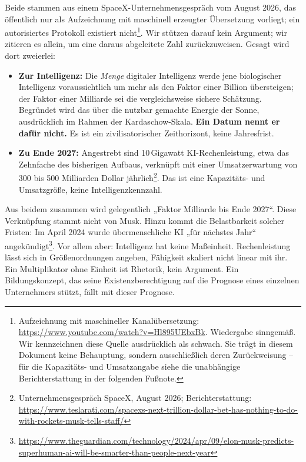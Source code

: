 \documentclass[11pt,a4paper]{article}
\begin{document}
Beide stammen aus einem SpaceX-Unternehmensgespräch vom August 2026, das öffentlich nur als Aufzeichnung mit maschinell erzeugter Übersetzung vorliegt; ein autorisiertes Protokoll existiert nicht\footnote{Aufzeichnung mit maschineller Kanalübersetzung: \url{https://www.youtube.com/watch?v=Hl895UEbxBk}. Wiedergabe sinngemäß. Wir kennzeichnen diese Quelle ausdrücklich als schwach. Sie trägt in diesem Dokument keine Behauptung, sondern ausschließlich deren Zurückweisung -- für die Kapazitäts- und Umsatzangabe siehe die unabhängige Berichterstattung in der folgenden Fußnote.}. Wir stützen darauf kein Argument; wir zitieren es allein, um eine daraus abgeleitete Zahl zurückzuweisen. Gesagt wird dort zweierlei:
\begin{itemize}[label=--]
    \item \textbf{Zur Intelligenz:} Die \textit{Menge} digitaler Intelligenz werde jene biologischer Intelligenz voraussichtlich um mehr als den Faktor einer Billion übersteigen; der Faktor einer Milliarde sei die vergleichsweise sichere Schätzung. Begründet wird das über die nutzbar gemachte Energie der Sonne, ausdrücklich im Rahmen der Kardaschow-Skala. \textbf{Ein Datum nennt er dafür nicht.} Es ist ein zivilisatorischer Zeithorizont, keine Jahresfrist.
    \item \textbf{Zu Ende 2027:} Angestrebt sind 10\,Gigawatt KI-Rechenleistung, etwa das Zehnfache des bisherigen Aufbaus, verknüpft mit einer Umsatzerwartung von 300 bis 500 Milliarden Dollar jährlich\footnote{Unternehmensgespräch SpaceX, August 2026; Berichterstattung: \url{https://www.teslarati.com/spacexs-next-trillion-dollar-bet-has-nothing-to-do-with-rockets-musk-tells-staff/}}. Das ist eine Kapazitäts- und Umsatzgröße, keine Intelligenzkennzahl.
\end{itemize}

\noindent Aus beidem zusammen wird gelegentlich „Faktor Milliarde bis Ende 2027“. Diese Verknüpfung stammt nicht von Musk. Hinzu kommt die Belastbarkeit solcher Fristen: Im April 2024 wurde übermenschliche KI „für nächstes Jahr“ angekündigt\footnote{\url{https://www.theguardian.com/technology/2024/apr/09/elon-musk-predicts-superhuman-ai-will-be-smarter-than-people-next-year}}. Vor allem aber: Intelligenz hat keine Maßeinheit. Rechenleistung lässt sich in Größenordnungen angeben, Fähigkeit skaliert nicht linear mit ihr. Ein Multiplikator ohne Einheit ist Rhetorik, kein Argument. Ein Bildungskonzept, das seine Existenzberechtigung auf die Prognose eines einzelnen Unternehmers stützt, fällt mit dieser Prognose.
\end{document}
